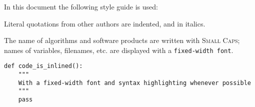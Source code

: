 In this document the following style guide is used:

\begin{displayquote}
    Literal quotations from other authors are indented, and in italics.
\end{displayquote}

The name of algorithms and software products are written with \textsc{Small Caps};
names of variables, filenames, etc. are displayed with a \texttt{fixed-width font}.

\begin{verbatim}
def code_is_inlined():
    """
    With a fixed-width font and syntax highlighting whenever possible
    """
    pass
\end{verbatim}

